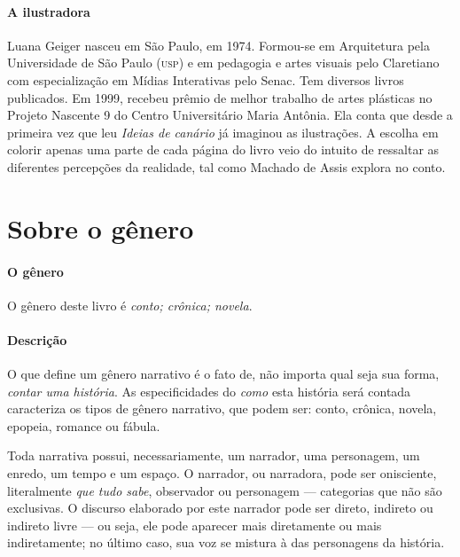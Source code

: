 \documentclass[11pt]{extarticle}
\begin{document}
\paragraph{A ilustradora} Luana Geiger nasceu em São Paulo, em 1974. Formou-se em Arquitetura pela Universidade de São Paulo (\textsc{usp}) e em pedagogia e artes visuais pelo Claretiano com especialização em Mídias Interativas pelo Senac. Tem diversos livros publicados. Em 1999, recebeu prêmio de melhor trabalho de artes plásticas no Projeto Nascente 9 do Centro Universitário Maria Antônia. Ela conta que desde a primeira vez que leu \textit{Ideias de canário} já imaginou as ilustrações. A escolha em colorir apenas uma parte de cada página do livro veio do intuito de ressaltar as diferentes percepções da realidade, tal como Machado de Assis explora no conto.



\section{Sobre o gênero}

\paragraph{O gênero} O gênero deste livro é \textit{conto; crônica; novela}.

\paragraph{Descrição} O que define um gênero narrativo é o fato de, não importa qual seja sua forma, \textit{contar uma história}.
As especificidades do \textit{como} esta história será contada caracteriza os tipos de gênero narrativo, que podem ser: conto, crônica, novela, epopeia, romance ou fábula. 

Toda narrativa possui, necessariamente, um narrador, uma personagem, um enredo, um tempo e um espaço. O narrador, ou narradora, pode ser onisciente, literalmente \textit{que tudo sabe}, observador ou personagem --- categorias que não são exclusivas. O discurso elaborado por este narrador pode ser direto, indireto ou indireto livre --- ou seja, ele pode aparecer mais diretamente ou mais indiretamente; no último caso, sua voz se mistura à das personagens da história.
\end{document}

